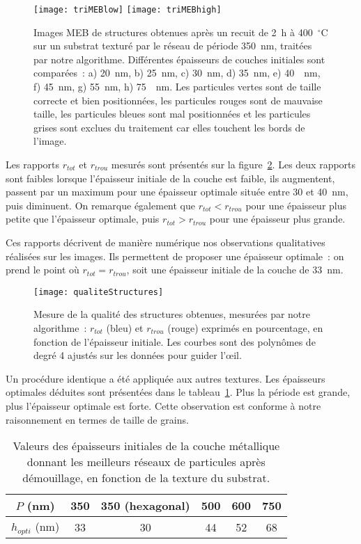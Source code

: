 \begin{figure}[!p]
\centering
\texttt{[image: triMEBlow]}
\texttt{[image: triMEBhigh]}
\caption{Images MEB de structures obtenues après un recuit de 2~h à 400~$^\circ$C sur un substrat texturé par le réseau de période 350~nm, traitées par notre algorithme. Différentes épaisseurs de couches initiales sont comparées~: a) 20~nm, b) 25~nm, c) 30~nm, d) 35~nm, e) 40~~nm, f) 45~nm, g) 55~nm, h) 75~~nm. Les particules vertes sont de taille correcte et bien positionnées, les particules rouges sont de mauvaise taille, les particules bleues sont mal positionnées et les particules grises sont exclues du traitement car elles touchent les bords de l'image.}
\label{triMEB350}
\end{figure}

Les rapports $r_{tot}$ et $r_{trou}$ mesurés sont présentés sur la figure~\ref{qualiteStructures}. Les deux rapports sont faibles lorsque l'épaisseur initiale de la couche est faible, ils augmentent, passent par un maximum pour une épaisseur \og optimale \fg{}  située entre 30 et 40~nm, puis diminuent. On remarque également que $r_{tot}<r_{trou}$ pour une épaisseur plus petite que l'épaisseur optimale, puis $r_{tot}>r_{trou}$ pour une épaisseur plus grande.\par 
Ces rapports décrivent de manière numérique nos observations qualitatives réalisées sur les images. Ils permettent de proposer une épaisseur optimale~: on prend le point où 
$r_{tot}=r_{trou}$, soit une épaisseur initiale de la couche de 33~nm.\par 
\begin{figure}[!htb]
\centering
\texttt{[image: qualiteStructures]}
\caption{Mesure de la qualité des structures obtenues, mesurées par notre algorithme~: $r_{tot}$ (bleu) et $r_{trou}$ (rouge) exprimés en pourcentage, en fonction de l'épaisseur initiale. Les courbes sont des polynômes de degré 4 ajustés sur les données pour guider l'œil.}
\label{qualiteStructures}
\end{figure}

Un procédure identique a été appliquée aux autres textures. Les épaisseurs optimales déduites sont présentées dans le tableau~\ref{tOptimaux}. Plus la période est grande, plus l'épaisseur optimale est forte. Cette observation est conforme à notre raisonnement en termes de taille de grains.\par 

\begin{table}[!htb]
\centering
\begin{tabular}{cccccc}
\hline
$P$ (nm) & 350 & 350 (hexagonal) & 500 & 600 & 750 \\
\hline
$h_{opti}$ (nm)&  33 & 30 & 44 & 52 & 68\\
\hline
\end{tabular}
\caption{Valeurs des épaisseurs initiales de la couche métallique donnant les meilleurs réseaux de particules après démouillage, en fonction de la texture du substrat.}
\label{tOptimaux}
\end{table}

